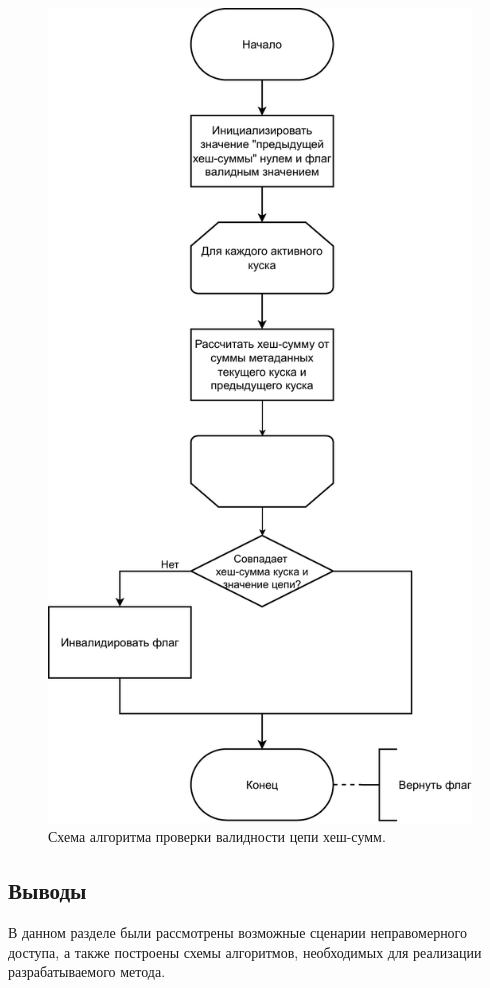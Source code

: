 \begin{figure}[hbtp]
	\centering
	\includegraphics[scale=0.75]{img/checkalgo.pdf}
	\caption{Схема алгоритма проверки валидности цепи хеш-сумм.}
	\label{fig:checkalgo}
\end{figure}

\subsection{Выводы}

В данном разделе были рассмотрены возможные сценарии неправомерного доступа, а также построены схемы алгоритмов, необходимых для реализации разрабатываемого метода.

\pagebreak